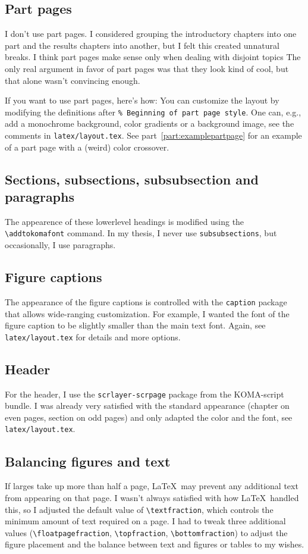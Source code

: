 \subsection{Part pages}
I don't use part pages. I considered grouping the introductory chapters into one part and the results chapters into another, but I felt this created unnatural breaks. I think part pages make sense only when dealing with disjoint topics The only real argument in favor of part pages was that they look kind of cool, but that alone wasn't convincing enough.

If you want to use part pages, here’s how: You can customize the layout by modifying the definitions after \verb|% Beginning of part page style|. One can, e.g., add a monochrome background, color gradients or a background image, see the comments in \verb|latex/layout.tex|. See part~\ref{part:examplepartpage} for an example of a part page with a (weird) color crossover.

\subsection{Sections, subsections, subsubsection and paragraphs}
The appearence of these lowerlevel headings is modified using the \verb|\addtokomafont| command. In my thesis, I never use \verb|subsubsections|, but occasionally, I use paragraphs.

\subsection{Figure captions}
The appearance of the figure captions is controlled with the \verb|caption| package that allows wide-ranging customization. For example, I wanted the font of the figure caption to be slightly smaller than the main text font. Again, see \verb|latex/layout.tex| for details and more options.

\subsection{Header}
For the header, I use the \verb|scrlayer-scrpage| package from the KOMA-script bundle. I was already very satisfied with the standard appearance (chapter on even pages, section on odd pages) and only adapted the color and the font, see \verb|latex/layout.tex|.

\subsection{Balancing figures and text}
If larges take up more than half a page, \LaTeX~may prevent any additional text from appearing on that page. I wasn't always satisfied with how \LaTeX~handled this, so I adjusted the default value of \verb|\textfraction|, which controls the minimum amount of text required on a page. I had to tweak three additional values (\verb|\floatpagefraction|, \verb|\topfraction|, \verb|\bottomfraction|) to adjust the figure placement and the balance between text and figures or tables to my wishes.
